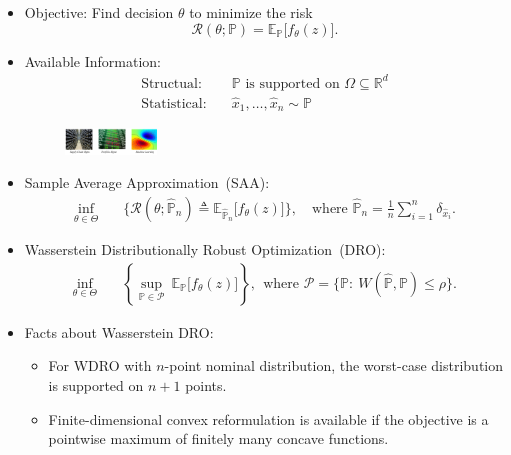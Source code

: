 \documentclass[landscape,a0b,final,a4resizeable]{include/a0poster}
\begin{document}
\begin{poster}
\begin{multicols}{4}
\vspace{0.1in} 


\begin{itemize}
\item
{
\LARGE
Objective: Find decision $\theta$ to minimize the risk
\[
\mathcal{R}(\theta;\mathbb{P}) = \mathbb{E}_{\mathbb{P}}\big[f_{\theta}(z)\big].
\]
}
\item
{
\LARGE
Available Information:
\[
\begin{array}{ll}
\mbox{Structual}:&\quad \mbox{$\mathbb{P}$ is supported on $\Omega\subseteq\mathbb{R}^d$}\\
\mbox{Statistical}:&\quad \mbox{$\hat{x}_1,\ldots,\hat{x}_n\sim \mathbb{P}$}
\end{array}
\]
}
\begin{figure}[H]
\centering
\includegraphics[width=0.23\textwidth]{figures/p_3}
\end{figure}
\item
{
\LARGE
Sample Average Approximation~(SAA):
\[
\begin{array}{ll}
\displaystyle
\inf_{\theta\in\Theta}&\quad \big\{
\mathcal{R}(\theta;\widehat{\mathbb{P}}_n) \triangleq \mathbb{E}_{\widehat{\mathbb{P}}_n}\big[f_{\theta}(z)\big]
\big\},\quad \text{where }\widehat{\mathbb{P}}_n=\frac{1}{n}\sum_{i=1}^n\delta_{\hat{x}_i}.
\end{array}
\] 
}
\item
{
\LARGE
Wasserstein Distributionally Robust Optimization~(DRO):
\[
\begin{array}{ll}
\inf\limits_{\theta\in\Theta}&\quad \left\{
\sup\limits_{\mathbb{P}\in\mathcal{P}}~\mathbb{E}_{\mathbb{P}}\big[f_{\theta}(z)\big]
\right\},~~ \text{where }
\mathcal{P} = \big\{
\mathbb{P}:~W(\widehat{\mathbb{P}}, \mathbb{P})\le \rho
\big\}.
\end{array}
\]
}
\item
{
\LARGE
Facts about Wasserstein DRO:\vspace{0.1in} 
\begin{itemize}
\item
For WDRO with $n$-point nominal distribution, the worst-case distribution is supported on $n+1$ points.\vspace{0.1in} 
\item
Finite-dimensional convex reformulation is available if the objective is a pointwise maximum of finitely many concave functions.\vspace{0.1in} 

\end{itemize}}
\end{itemize}
\end{multicols}
\end{poster}
\end{document}
